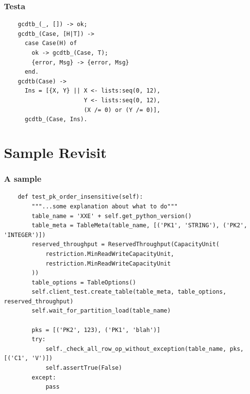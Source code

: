\documentclass[lualatex]{beamer}
\begin{document}
\begin{frame}[fragile]
  \frametitle{Testa}

  \begin{verbatim}
    gcdtb_(_, []) -> ok;
    gcdtb_(Case, [H|T]) -> 
      case Case(H) of
        ok -> gcdtb_(Case, T);
        {error, Msg} -> {error, Msg}
      end.
    gcdtb(Case) ->
      Ins = [{X, Y} || X <- lists:seq(0, 12),
                       Y <- lists:seq(0, 12),
                       (X /= 0) or (Y /= 0)],
      gcdtb_(Case, Ins).
  \end{verbatim}
\end{frame}

\section{Sample Revisit}

\begin{frame}[fragile]
  \frametitle{A sample}

  \begin{verbatim}
    def test_pk_order_insensitive(self):
        """...some explanation about what to do"""
        table_name = 'XXE' + self.get_python_version()
        table_meta = TableMeta(table_name, [('PK1', 'STRING'), ('PK2', 'INTEGER')])
        reserved_throughput = ReservedThroughput(CapacityUnit(
            restriction.MinReadWriteCapacityUnit,
            restriction.MinReadWriteCapacityUnit
        ))
        table_options = TableOptions()
        self.client_test.create_table(table_meta, table_options, reserved_throughput)
        self.wait_for_partition_load(table_name)
 
        pks = [('PK2', 123), ('PK1', 'blah')]
        try:
            self._check_all_row_op_without_exception(table_name, pks, [('C1', 'V')])
            self.assertTrue(False)
        except:
            pass
  \end{verbatim}
\end{frame}
\end{document}
